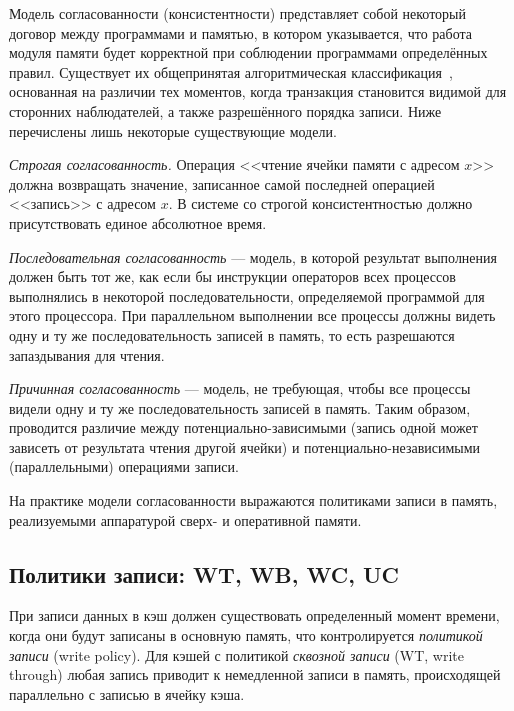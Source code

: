 Модель согласованности (консистентности) представляет собой некоторый договор между программами и памятью, в котором указывается, что работа модуля памяти будет корректной при соблюдении программами определённых правил. Существует их общепринятая алгоритмическая классификация~\cite{Mosberger93memoryconsistency}, основанная на различии тех моментов, когда транзакция становится видимой для сторонних наблюдателей, а также разрешённого порядка записи. Ниже перечислены лишь некоторые существующие модели.

\begin{enumerate*}
\item    \textit{Строгая согласованность.} Операция <<чтение ячейки памяти с адресом $x$>> должна возвращать значение, записанное самой последней операцией <<запись>> с адресом $x$. В системе со строгой консистентностью должно присутствовать единое абсолютное время.

\item    \textit{Последовательная согласованность} — модель, в которой результат выполнения должен быть тот же, как если бы инструкции операторов всех процессов выполнялись в некоторой последовательности, определяемой программой для этого процессора. При параллельном выполнении все процессы должны видеть одну и ту же последовательность записей в память, то есть разрешаются запаздывания для чтения.

\item    \textit{Причинная согласованность} — модель, не требующая, чтобы все процессы видели одну и ту же последовательность записей в память. Таким образом, проводится различие между потенциально-зависимыми (запись одной может зависеть от результата чтения другой ячейки) и потенциально-независимыми (параллельными) операциями записи.

\end{enumerate*}

На практике модели согласованности выражаются политиками записи в память, реализуемыми аппаратурой сверх- и оперативной памяти.

\subsection[Политики записи]{Политики записи: WT, WB, WC, UC}

При записи данных в кэш должен существовать определенный момент времени, когда они будут записаны в основную память, что контролируется \textit{политикой записи} (\abbr write policy). Для кэшей с политикой \textit{сквозной записи} (WT, \abbr write through) любая запись приводит к немедленной записи в память, происходящей параллельно с записью в ячейку кэша. 


